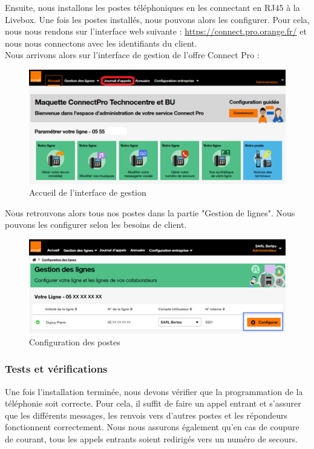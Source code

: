 \documentclass[12pt, a4paper]{article}
\begin{document}
Ensuite, nous installons les postes téléphoniques
en les connectant en RJ45 à la Livebox. Une fois
les postes installés, nous pouvons alors les
configurer. Pour cela, nous nous rendons sur 
l'interface web suivante : \url{https://connect.pro.orange.fr/}
et nous nous connectons avec les identifiants
du client.\\

Nous arrivons alors sur l'interface de gestion
de l'offre Connect Pro : 
\begin{figure}[h]
	\centering
	\includegraphics[scale=1.3]{img/accueil.png}
	\caption{Accueil de l'interface de gestion}
\end{figure}

Nous retrouvons alors tous nos postes 
dans la partie "Gestion de lignes". Nous pouvons
les configurer selon les besoins de client. 

\begin{figure}[h]
	\centering
	\includegraphics[scale=0.65]{img/configuration.jpg}
	\caption{Configuration des postes}
\end{figure}

\newpage
\subsubsection{Tests et vérifications}
Une fois l'installation terminée, nous devons
vérifier que la programmation de la téléphonie 
soit correcte. Pour cela, il suffit de faire 
un appel entrant et s'assurer que les différents
messages, les renvois vers d'autres postes et
les répondeurs fonctionnent correctement. 
Nous nous assurons également qu'en cas 
de coupure de courant, tous les appels entrants
soient redirigés vers un numéro de secours.\\
\end{document}
